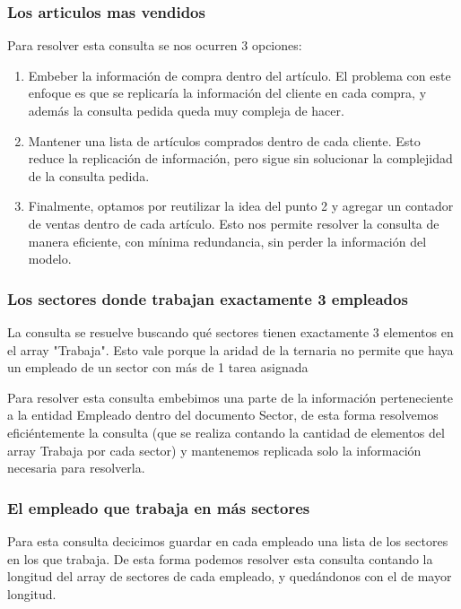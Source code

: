 \subsubsection{Los articulos mas vendidos}

Para resolver esta consulta se nos ocurren 3 opciones:

\begin{enumerate}
	\item Embeber la informaci\'on de compra dentro del art\'iculo. El problema con este enfoque es que se replicar\'ia la informaci\'on del cliente en cada compra, y adem\'as la consulta pedida queda muy compleja de hacer.

	\item Mantener una lista de art\'iculos comprados dentro de cada cliente. Esto reduce la replicaci\'on de informaci\'on, pero sigue sin solucionar la complejidad de la consulta pedida.

	\item Finalmente, optamos por reutilizar la idea del punto 2 y agregar un contador de ventas dentro de cada art\'iculo. Esto nos permite resolver la consulta de manera eficiente, con m\'inima redundancia, sin perder la informaci\'on del modelo.
\end{enumerate}

\subsubsection{Los sectores donde trabajan exactamente 3 empleados}

La consulta se resuelve buscando qu\'e sectores tienen exactamente 3 elementos en el array "Trabaja". Esto vale porque la aridad de la ternaria no permite que haya un empleado de un sector con m\'as de 1 tarea asignada

Para resolver esta consulta embebimos una parte de la informaci\'on perteneciente a la entidad Empleado dentro del documento Sector, de esta forma resolvemos efici\'entemente la consulta (que se realiza contando la cantidad de elementos del array Trabaja por cada sector) y mantenemos replicada solo la informaci\'on necesaria para resolverla.

\subsubsection{El empleado que trabaja en m\'as sectores}

Para esta consulta decicimos guardar en cada empleado una lista de los sectores en los que trabaja. De esta forma podemos resolver esta consulta contando la longitud del array de sectores de cada empleado, y qued\'andonos con el de mayor longitud. 

